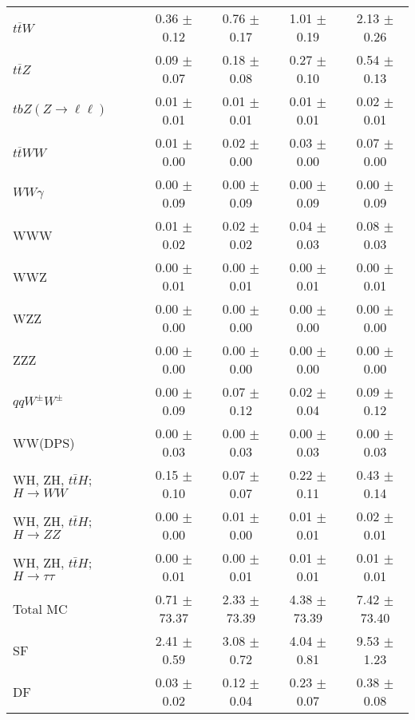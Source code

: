 \begin{tabular}{l|cccc}
                   $t\overline{t}W$ &  0.36 $\pm$  0.12 &  0.76 $\pm$  0.17 &  1.01 $\pm$  0.19 &  2.13 $\pm$  0.26 \\
                   $t\overline{t}Z$ &  0.09 $\pm$  0.07 &  0.18 $\pm$  0.08 &  0.27 $\pm$  0.10 &  0.54 $\pm$  0.13 \\
    $tbZ (Z \rightarrow \ell \ell)$ &  0.01 $\pm$  0.01 &  0.01 $\pm$  0.01 &  0.01 $\pm$  0.01 &  0.02 $\pm$  0.01 \\
                  $t\overline{t}WW$ &  0.01 $\pm$  0.00 &  0.02 $\pm$  0.00 &  0.03 $\pm$  0.00 &  0.07 $\pm$  0.00 \\
                         $WW\gamma$ &  0.00 $\pm$  0.09 &  0.00 $\pm$  0.09 &  0.00 $\pm$  0.09 &  0.00 $\pm$  0.09 \\
                                WWW &  0.01 $\pm$  0.02 &  0.02 $\pm$  0.02 &  0.04 $\pm$  0.03 &  0.08 $\pm$  0.03 \\
                                WWZ &  0.00 $\pm$  0.01 &  0.00 $\pm$  0.01 &  0.00 $\pm$  0.01 &  0.00 $\pm$  0.01 \\
                                WZZ &  0.00 $\pm$  0.00 &  0.00 $\pm$  0.00 &  0.00 $\pm$  0.00 &  0.00 $\pm$  0.00 \\
                                ZZZ &  0.00 $\pm$  0.00 &  0.00 $\pm$  0.00 &  0.00 $\pm$  0.00 &  0.00 $\pm$  0.00 \\
                 $qqW^{\pm}W^{\pm}$ &  0.00 $\pm$  0.09 &  0.07 $\pm$  0.12 &  0.02 $\pm$  0.04 &  0.09 $\pm$  0.12 \\
                            WW(DPS) &  0.00 $\pm$  0.03 &  0.00 $\pm$  0.03 &  0.00 $\pm$  0.03 &  0.00 $\pm$  0.03 \\
WH, ZH, $t\bar{t}H$; $H \rightarrow WW$ &  0.15 $\pm$  0.10 &  0.07 $\pm$  0.07 &  0.22 $\pm$  0.11 &  0.43 $\pm$  0.14 \\
WH, ZH, $t\bar{t}H$; $H \rightarrow ZZ$ &  0.00 $\pm$  0.00 &  0.01 $\pm$  0.00 &  0.01 $\pm$  0.01 &  0.02 $\pm$  0.01 \\
WH, ZH, $t\bar{t}H$; $H \rightarrow \tau\tau$ &  0.00 $\pm$  0.01 &  0.00 $\pm$  0.01 &  0.01 $\pm$  0.01 &  0.01 $\pm$  0.01 \\
\hline\hline
                           Total MC &  0.71 $\pm$ 73.37 &  2.33 $\pm$ 73.39 &  4.38 $\pm$ 73.39 &  7.42 $\pm$ 73.40 \\
\hline
                                 SF &  2.41 $\pm$  0.59 &  3.08 $\pm$  0.72 &  4.04 $\pm$  0.81 &  9.53 $\pm$  1.23 \\
                                 DF &  0.03 $\pm$  0.02 &  0.12 $\pm$  0.04 &  0.23 $\pm$  0.07 &  0.38 $\pm$  0.08 \\

\end{tabular}
